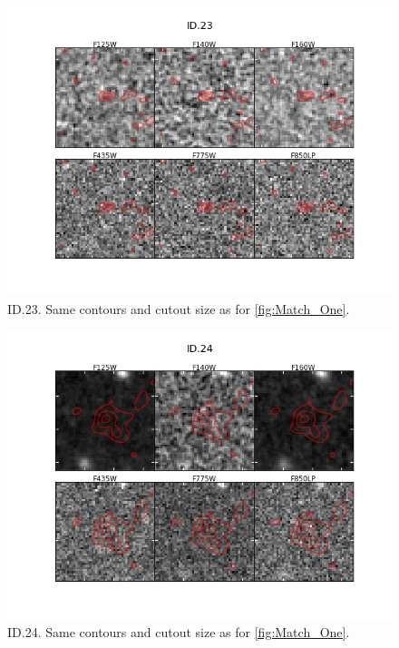 \begin{figure}[tbp]
\centering \includegraphics[width=160mm]{Matched/ASPECS_Cutout_22.png}
\caption{ID.23. Same contours and cutout size as for \ref{fig:Match_One}.}
\label{fig:Match_Three}
\end{figure}

\begin{figure}[tbp]
\centering \includegraphics[width=160mm]{Matched/ASPECS_Cutout_23.png}
\caption{ID.24. Same contours and cutout size as for \ref{fig:Match_One}.}
\label{fig:Match_Three}
\end{figure}

